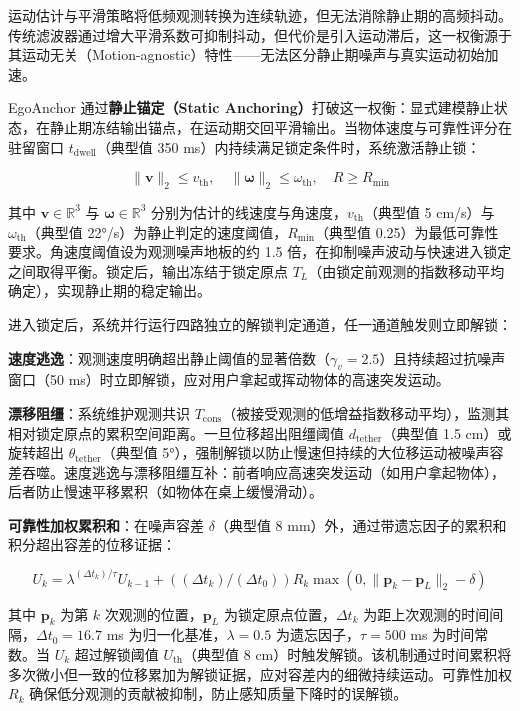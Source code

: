 \documentclass[review]{vgtc}
\begin{document}
运动估计与平滑策略将低频观测转换为连续轨迹，但无法消除静止期的高频抖动。传统滤波器通过增大平滑系数可抑制抖动，但代价是引入运动滞后，这一权衡源于其运动无关（Motion-agnostic）特性------无法区分静止期噪声与真实运动初始加速。

EgoAnchor 通过\textbf{静止锚定（Static Anchoring）}打破这一权衡：显式建模静止状态，在静止期冻结输出锚点，在运动期交回平滑输出。当物体速度与可靠性评分在驻留窗口 $t_{\mathrm{dwell}}$（典型值 350 ms）内持续满足锁定条件时，系统激活静止锁：

\begin{equation}
\lVert \mathbf{v} \rVert_2 \leq v_{\mathrm{th}}, \quad \lVert \mathbf{\omega} \rVert_2 \leq \omega_{\mathrm{th}}, \quad R \geq R_{\mathrm{min}}
\label{eq:lock-condition}
\end{equation}


其中 $\mathbf{v} \in \mathbb{R}^3$ 与 $\mathbf{\omega} \in \mathbb{R}^3$ 分别为估计的线速度与角速度，$v_{\mathrm{th}}$（典型值 5 cm/s）与 $\omega_{\mathrm{th}}$（典型值 22°/s）为静止判定的速度阈值，$R_{\mathrm{min}}$（典型值 0.25）为最低可靠性要求。角速度阈值设为观测噪声地板的约 1.5 倍，在抑制噪声波动与快速进入锁定之间取得平衡。锁定后，输出冻结于锁定原点 $T_L$（由锁定前观测的指数移动平均确定），实现静止期的稳定输出。

进入锁定后，系统并行运行四路独立的解锁判定通道，任一通道触发则立即解锁：

\textbf{速度逃逸}：观测速度明确超出静止阈值的显著倍数（$\gamma_v = 2.5$）且持续超过抗噪声窗口（50 ms）时立即解锁，应对用户拿起或挥动物体的高速突发运动。

\textbf{漂移阻缰}：系统维护观测共识 $T_{\mathrm{cons}}$（被接受观测的低增益指数移动平均），监测其相对锁定原点的累积空间距离。一旦位移超出阻缰阈值 $d_{\mathrm{tether}}$（典型值 1.5 cm）或旋转超出 $\theta_{\mathrm{tether}}$（典型值 5°），强制解锁以防止慢速但持续的大位移运动被噪声容差吞噬。速度逃逸与漂移阻缰互补：前者响应高速突发运动（如用户拿起物体），后者防止慢速平移累积（如物体在桌上缓慢滑动）。

\textbf{可靠性加权累积和}：在噪声容差 $\delta$（典型值 8 mm）外，通过带遗忘因子的累积和积分超出容差的位移证据：

\begin{equation}
U_k = \lambda^{(\Delta t_k) / \tau} U_{k-1} + ((\Delta t_k) / (\Delta t_0)) R_k \max\!\left(0, \lVert \mathbf{p}_k - \mathbf{p}_L \rVert_2 - \delta\right)
\label{eq:cusum}
\end{equation}


其中 $\mathbf{p}_k$ 为第 $k$ 次观测的位置，$\mathbf{p}_L$ 为锁定原点位置，$\Delta t_k$ 为距上次观测的时间间隔，$\Delta t_0 = 16.7$ ms 为归一化基准，$\lambda = 0.5$ 为遗忘因子，$\tau = 500$ ms 为时间常数。当 $U_k$ 超过解锁阈值 $U_{\mathrm{th}}$（典型值 8 cm）时触发解锁。该机制通过时间累积将多次微小但一致的位移累加为解锁证据，应对容差内的细微持续运动。可靠性加权 $R_k$ 确保低分观测的贡献被抑制，防止感知质量下降时的误解锁。
\end{document}
